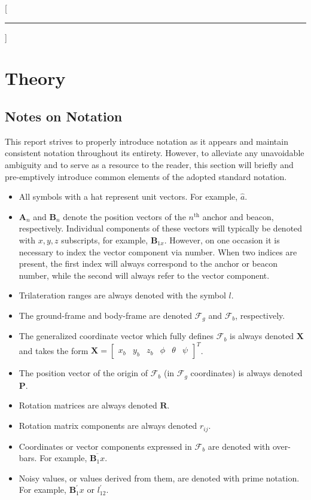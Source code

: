 \documentclass{report}
\begin{document}
\tableofcontents

\newpage

\renewcommand{\thechapter}{\arabic{chapter}}
\titleformat{\chapter}[display]{\bfseries\Huge}{Section\ \thechapter}{0.0ex}{}[\rule{\textwidth}{3pt}]
\setcounter{chapter}{0}

	\chapter{Theory}
		\section{Notes on Notation}
			This report strives to properly introduce notation as it appears and maintain consistent notation throughout its entirety. However, to alleviate any unavoidable ambiguity and to serve as a resource to the reader, this section will briefly and pre-emptively introduce common elements of the adopted standard notation.
			\begin{itemize}[wide, labelwidth=!, labelindent=0pt, label={\bf\textendash}]
				\item All symbols with a hat represent unit vectors. For example, $\hat{a}$.
				\item $\mathbf{A}_n$ and $\mathbf{B}_n$ denote the position vectors of the $n^\text{th}$ anchor and beacon, respectively. Individual components of these vectors will typically be denoted with $x,y,z$ subscripts, for example, $\mathbf{B}_{1x}$. However, on one occasion it is necessary to index the vector component via number. When two indices are present, the first index will always correspond to the anchor or beacon number, while the second will always refer to the vector component.
				\item Trilateration ranges are always denoted with the symbol $l$.
				\item The ground-frame and body-frame are denoted $\mathcal{F}_g$ and $\mathcal{F}_b$, respectively. 
				\item The generalized coordinate vector which fully defines $\mathcal{F}_b$ is always denoted $\mathbf{X}$ and takes the form $\mathbf{X}=\begin{bmatrix}x_b & y_b & z_b & \phi & \theta & \psi \end{bmatrix}^T$.
				\item The position vector of the origin of $\mathcal{F}_b$ (in $\mathcal{F}_g$ coordinates) is always denoted $\mathbf{P}$.
				\item Rotation matrices are always denoted $\mathbf{R}$.
				\item Rotation matrix components are always denoted $r_{ij}$.
				\item Coordinates or vector components expressed in $\mathcal{F}_b$ are denoted with over-bars. For example, $\overline{\mathbf{B}_1x}$.
				\item Noisy values, or values derived from them, are denoted with prime notation. For example, $\mathbf{B}^\prime_1x$ or $l^\prime_{12}$.
			\end{itemize}
		
\end{document}
